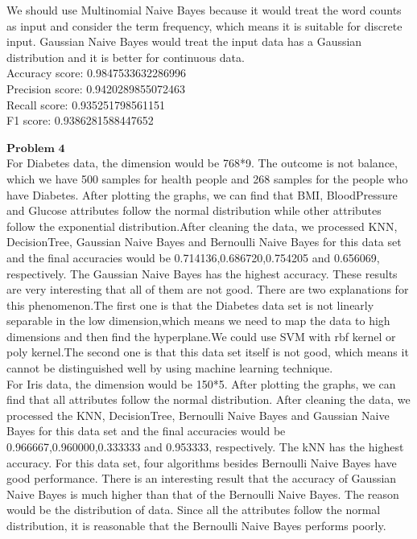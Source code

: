 \documentclass[12pt]{article}
\begin{document}
We should use Multinomial Naive Bayes because it would treat the word counts as input and consider the term frequency, which means it is suitable for discrete input. Gaussian Naive Bayes would treat the input data has a Gaussian distribution and it is better for continuous data.\\

Accuracy score: 0.9847533632286996\\

Precision score: 0.9420289855072463\\

Recall score: 0.935251798561151\\

F1 score: 0.9386281588447652\\

\newpage

$\textbf{Problem 4}$\\

For Diabetes data, the dimension would be 768*9. The outcome is not balance, which we have 500 samples for health people and 268 samples for the people who have Diabetes. After plotting the graphs, we can find that BMI, BloodPressure and Glucose attributes follow the normal distribution while other attributes follow the exponential distribution.After cleaning the data, we processed KNN, DecisionTree, Gaussian Naive Bayes and Bernoulli Naive Bayes for this data set and the final accuracies would be 0.714136,0.686720,0.754205 and 0.656069, respectively. The Gaussian Naive Bayes has the highest accuracy. These results are very interesting that all of them are not good. There are two explanations for this phenomenon.The first one is that the Diabetes data set is not linearly separable in the low dimension,which means we need to map the data to high dimensions and then find the hyperplane.We could use SVM with rbf kernel or poly kernel.The second one is that this data set itself is not good, which means it cannot be distinguished well by using machine learning technique.\\

For Iris data, the dimension would be 150*5. After plotting the graphs, we can find that all attributes follow the normal distribution. After cleaning the data, we processed the KNN, DecisionTree, Bernoulli Naive Bayes and Gaussian Naive Bayes for this data set and the final accuracies would be 0.966667,0.960000,0.333333 and 0.953333, respectively. The kNN has the highest accuracy. For this data set, four algorithms besides Bernoulli Naive Bayes have good performance. There is an interesting result that the accuracy of Gaussian Naive Bayes is much higher than that of the Bernoulli Naive Bayes. The reason would be the distribution of data. Since all the attributes follow the normal distribution, it is reasonable that the Bernoulli Naive Bayes performs poorly.\\
\end{document}
